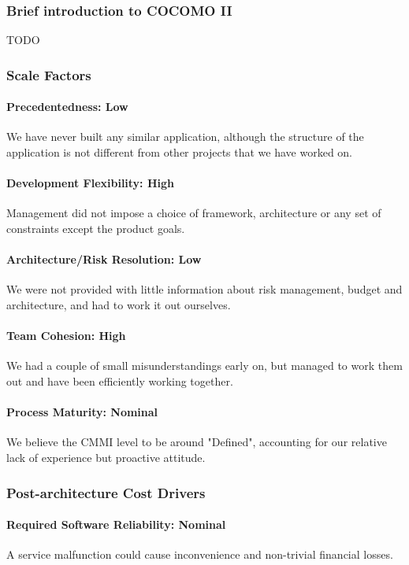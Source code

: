 \subsubsection{Brief introduction to COCOMO II}
TODO

\subsubsection{Scale Factors}
\paragraph*{Precedentedness: Low}
We have never built any similar application, although the structure of the application is not different from other projects that we have worked on.

\paragraph*{Development Flexibility: High}
Management did not impose a choice of framework, architecture or any set of constraints except the product goals.

\paragraph*{Architecture/Risk Resolution: Low}
We were not provided with little information about risk management, budget and architecture, and had to work it out ourselves.

\paragraph*{Team Cohesion: High}
We had a couple of small misunderstandings early on, but managed to work them out and have been efficiently working together.

\paragraph*{Process Maturity: Nominal}
We believe the CMMI level to be around "Defined", accounting for our relative lack of experience but proactive attitude.

\subsubsection{Post-architecture Cost Drivers}
\paragraph*{Required Software Reliability: Nominal}
A service malfunction could cause inconvenience and non-trivial financial losses.

